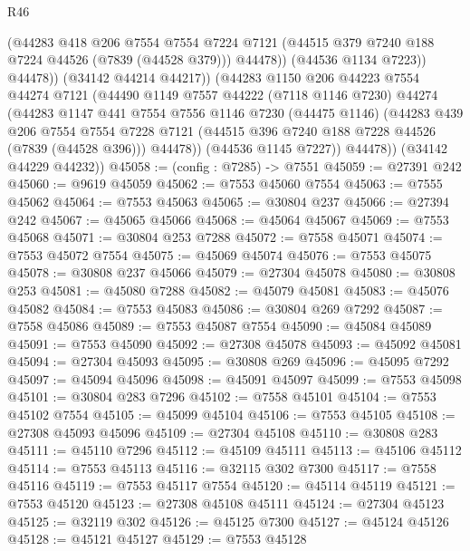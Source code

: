 \begin{lexlean}{R46}
\begin{coremodule}
                  (@44283
                    @418
                    @206
                    @7554
                    @7554
                    @7224
                    @7121
                    (@44515 @379 @7240 @188 @7224 @44526 (@7839 (@44528 @379)))
                    @44478))
                (@44536 @1134 @7223))
              @44478))
          (@34142 @44214 @44217))
        (@44283
          @1150
          @206
          @44223
          @7554
          @44274
          @7121
          (@44490
            @1149
            @7557
            @44222
            (@7118 @1146 @7230)
            @44274
            (@44283
              @1147
              @441
              @7554
              @7556
              @1146
              @7230
              (@44475 @1146)
              (@44283
                @439
                @206
                @7554
                @7554
                @7228
                @7121
                (@44515 @396 @7240 @188 @7228 @44526 (@7839 (@44528 @396)))
                @44478))
            (@44536 @1145 @7227))
          @44478))
      (@34142 @44229 @44232))
@45058 := (config : @7285) -> @7551
@45059 := @27391 @242
@45060 := @9619 @45059
@45062 := @7553 @45060 @7554
@45063 := @7555 @45062
@45064 := @7553 @45063
@45065 := @30804 @237
@45066 := @27394 @242
@45067 := @45065 @45066
@45068 := @45064 @45067
@45069 := @7553 @45068
@45071 := @30804 @253 @7288
@45072 := @7558 @45071
@45074 := @7553 @45072 @7554
@45075 := @45069 @45074
@45076 := @7553 @45075
@45078 := @30808 @237 @45066
@45079 := @27304 @45078
@45080 := @30808 @253
@45081 := @45080 @7288
@45082 := @45079 @45081
@45083 := @45076 @45082
@45084 := @7553 @45083
@45086 := @30804 @269 @7292
@45087 := @7558 @45086
@45089 := @7553 @45087 @7554
@45090 := @45084 @45089
@45091 := @7553 @45090
@45092 := @27308 @45078
@45093 := @45092 @45081
@45094 := @27304 @45093
@45095 := @30808 @269
@45096 := @45095 @7292
@45097 := @45094 @45096
@45098 := @45091 @45097
@45099 := @7553 @45098
@45101 := @30804 @283 @7296
@45102 := @7558 @45101
@45104 := @7553 @45102 @7554
@45105 := @45099 @45104
@45106 := @7553 @45105
@45108 := @27308 @45093 @45096
@45109 := @27304 @45108
@45110 := @30808 @283
@45111 := @45110 @7296
@45112 := @45109 @45111
@45113 := @45106 @45112
@45114 := @7553 @45113
@45116 := @32115 @302 @7300
@45117 := @7558 @45116
@45119 := @7553 @45117 @7554
@45120 := @45114 @45119
@45121 := @7553 @45120
@45123 := @27308 @45108 @45111
@45124 := @27304 @45123
@45125 := @32119 @302
@45126 := @45125 @7300
@45127 := @45124 @45126
@45128 := @45121 @45127
@45129 := @7553 @45128

\end{coremodule}
\end{lexlean}
